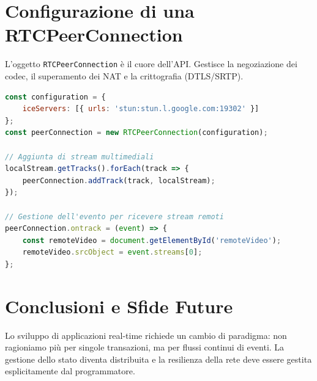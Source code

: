 \documentclass[11pt,a4paper]{report}
\begin{document}
\section{Configurazione di una RTCPeerConnection}
L'oggetto \texttt{RTCPeerConnection} è il cuore dell'API. Gestisce la negoziazione dei codec, il superamento dei NAT e la crittografia (DTLS/SRTP).

\begin{lstlisting}[language=javascript, caption=Bootstrap di una connessione P2P]
const configuration = { 
    iceServers: [{ urls: 'stun:stun.l.google.com:19302' }] 
};
const peerConnection = new RTCPeerConnection(configuration);

// Aggiunta di stream multimediali
localStream.getTracks().forEach(track => {
    peerConnection.addTrack(track, localStream);
});

// Gestione dell'evento per ricevere stream remoti
peerConnection.ontrack = (event) => {
    const remoteVideo = document.getElementById('remoteVideo');
    remoteVideo.srcObject = event.streams[0];
};
\end{lstlisting}

\section{Conclusioni e Sfide Future}
Lo sviluppo di applicazioni real-time richiede un cambio di paradigma: non ragioniamo più per singole transazioni, ma per flussi continui di eventi. La gestione dello stato diventa distribuita e la resilienza della rete deve essere gestita esplicitamente dal programmatore.
\end{document}
